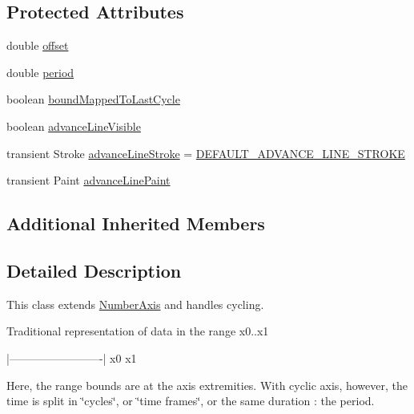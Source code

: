 \subsection*{Protected Attributes}
\begin{DoxyCompactItemize}
\item 
double \mbox{\hyperlink{classorg_1_1jfree_1_1chart_1_1axis_1_1_cyclic_number_axis_a6e933c67b716e70d85f4438740fce7b1}{offset}}
\item 
double \mbox{\hyperlink{classorg_1_1jfree_1_1chart_1_1axis_1_1_cyclic_number_axis_a3c65906e3e4963a1cf1f9ade9237ea7c}{period}}
\item 
boolean \mbox{\hyperlink{classorg_1_1jfree_1_1chart_1_1axis_1_1_cyclic_number_axis_a0d7a9ffb7ad0c1644fede95a6b6a38af}{bound\+Mapped\+To\+Last\+Cycle}}
\item 
boolean \mbox{\hyperlink{classorg_1_1jfree_1_1chart_1_1axis_1_1_cyclic_number_axis_a5ac19f784e89ecc297f488aefa279bcc}{advance\+Line\+Visible}}
\item 
transient Stroke \mbox{\hyperlink{classorg_1_1jfree_1_1chart_1_1axis_1_1_cyclic_number_axis_abcec5d00fa56378856b3ea627501f79a}{advance\+Line\+Stroke}} = \mbox{\hyperlink{classorg_1_1jfree_1_1chart_1_1axis_1_1_cyclic_number_axis_a5bc1187c8b3cd763e28f2cb6f9f09716}{D\+E\+F\+A\+U\+L\+T\+\_\+\+A\+D\+V\+A\+N\+C\+E\+\_\+\+L\+I\+N\+E\+\_\+\+S\+T\+R\+O\+KE}}
\item 
transient Paint \mbox{\hyperlink{classorg_1_1jfree_1_1chart_1_1axis_1_1_cyclic_number_axis_a414e25b56f28ceba02c03db2cf97c4e6}{advance\+Line\+Paint}}
\end{DoxyCompactItemize}
\subsection*{Additional Inherited Members}


\subsection{Detailed Description}
This class extends \mbox{\hyperlink{classorg_1_1jfree_1_1chart_1_1axis_1_1_number_axis}{Number\+Axis}} and handles cycling.

Traditional representation of data in the range x0..x1 
\begin{DoxyPre}
|-------------------------|
x0                       x1
\end{DoxyPre}


Here, the range bounds are at the axis extremities. With cyclic axis, however, the time is split in \char`\"{}cycles\char`\"{}, or \char`\"{}time frames\char`\"{}, or the same duration \+: the period.

